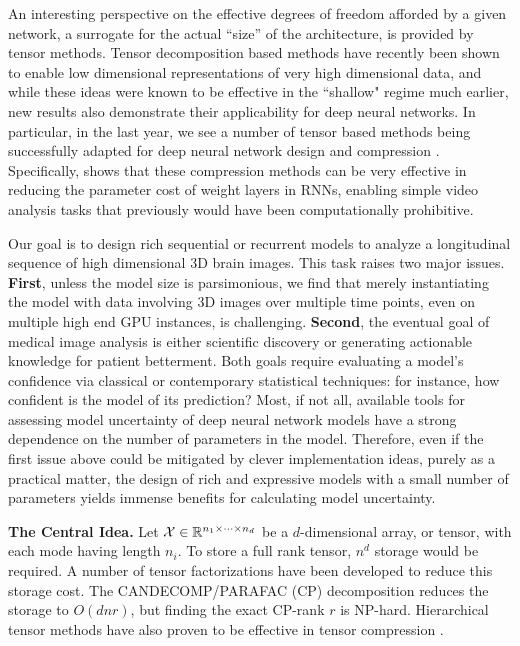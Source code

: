 An interesting perspective on the effective degrees of freedom afforded 
by a given network, a surrogate for the actual ``size'' of the architecture, 
is provided by tensor methods.
Tensor decomposition based methods have recently been shown to enable low dimensional representations of very high dimensional data, 
and while these ideas were known to be effective in the ``shallow" regime much earlier, new results also demonstrate their applicability for deep neural 
networks. 
In particular, in the last year, we see a number of tensor based methods being successfully adapted for deep neural network design and compression \citep{cohen2016expressive,zhang2017tucker,yu2017compressing}.
Specifically, \citep{pmlr-v70-yang17e} shows that these compression methods can be very effective in reducing the parameter cost of weight layers in RNNs, enabling simple video analysis tasks that previously would have been computationally prohibitive.

Our goal is to design rich sequential or recurrent models to analyze a longitudinal sequence of high dimensional 3D brain images. 
This task raises two major issues. \textbf{First}, 
unless the model size is parsimonious, we find that merely instantiating the 
model with data involving 3D images over multiple time points, even on multiple high end GPU instances, is challenging.
\textbf{Second}, 
the eventual goal of medical image analysis is either scientific discovery or generating 
actionable knowledge for patient betterment. 
Both goals require evaluating a model's confidence via 
classical or contemporary statistical techniques: for instance, how confident is the model of its prediction?  
Most, if not all, available tools for assessing 
model uncertainty of deep neural network models 
have a strong dependence on the number of parameters in 
the model. Therefore, even if the first issue above could be mitigated by clever implementation ideas, purely as a practical 
matter, the design of rich and expressive models with a small number of parameters yields immense benefits for calculating model uncertainty.

\textbf{The Central Idea.}
Let $\mathcal{X} \in \mathbb{R}^{n_1 \times \cdots \times n_d}$ be a $d$-dimensional array, or tensor, with each mode having length $n_i$. To store a full rank tensor, $n^d$ storage would be required. A number of tensor factorizations have been developed to reduce this storage cost. The CANDECOMP/PARAFAC (CP) \citep{harshman1970foundations,carroll1970analysis} decomposition reduces the storage to $O(dnr)$, but finding the exact CP-rank $r$ is NP-hard. Hierarchical tensor methods have also proven to be effective in tensor compression \citep{cohen2016expressive, cohen2016convolutional}.


